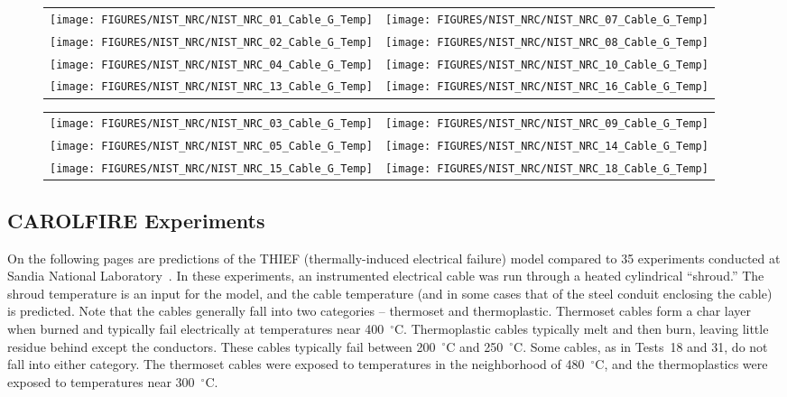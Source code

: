 \begin{figure}[p]
\begin{tabular*}{\textwidth}{l@{\extracolsep{\fill}}r}
\texttt{[image: FIGURES/NIST\_NRC/NIST\_NRC\_01\_Cable\_G\_Temp]} &
\texttt{[image: FIGURES/NIST\_NRC/NIST\_NRC\_07\_Cable\_G\_Temp]} \\
\texttt{[image: FIGURES/NIST\_NRC/NIST\_NRC\_02\_Cable\_G\_Temp]} &
\texttt{[image: FIGURES/NIST\_NRC/NIST\_NRC\_08\_Cable\_G\_Temp]} \\
\texttt{[image: FIGURES/NIST\_NRC/NIST\_NRC\_04\_Cable\_G\_Temp]} &
\texttt{[image: FIGURES/NIST\_NRC/NIST\_NRC\_10\_Cable\_G\_Temp]} \\
\texttt{[image: FIGURES/NIST\_NRC/NIST\_NRC\_13\_Cable\_G\_Temp]} &
\texttt{[image: FIGURES/NIST\_NRC/NIST\_NRC\_16\_Cable\_G\_Temp]}
\end{tabular*}
\label{NIST_NRC_Cable_G_Closed}
\end{figure}

\begin{figure}[p]
\begin{tabular*}{\textwidth}{l@{\extracolsep{\fill}}r}
\texttt{[image: FIGURES/NIST\_NRC/NIST\_NRC\_03\_Cable\_G\_Temp]} &
\texttt{[image: FIGURES/NIST\_NRC/NIST\_NRC\_09\_Cable\_G\_Temp]} \\
\texttt{[image: FIGURES/NIST\_NRC/NIST\_NRC\_05\_Cable\_G\_Temp]} &
\texttt{[image: FIGURES/NIST\_NRC/NIST\_NRC\_14\_Cable\_G\_Temp]} \\
\texttt{[image: FIGURES/NIST\_NRC/NIST\_NRC\_15\_Cable\_G\_Temp]} &
\texttt{[image: FIGURES/NIST\_NRC/NIST\_NRC\_18\_Cable\_G\_Temp]}
\end{tabular*}
\label{NIST_NRC_Cable_G_Open}
\end{figure}

\clearpage



\subsection{CAROLFIRE Experiments}

On the following pages are predictions of the THIEF (thermally-induced electrical failure) model compared to 35 experiments conducted at Sandia National Laboratory~\cite{CAROLFIRE}. In these experiments, an instrumented electrical cable was run through a heated cylindrical ``shroud.'' The shroud temperature is an input for the model, and the cable temperature (and in some cases that of the steel conduit enclosing the cable) is predicted. Note that the cables generally fall into two categories -- thermoset and thermoplastic. Thermoset cables form a char layer when burned and typically fail electrically at temperatures near 400~$^\circ$C. Thermoplastic cables typically melt and then burn, leaving little residue behind except the conductors. These cables typically fail between 200~$^\circ$C and 250~$^\circ$C. Some cables, as in Tests~18 and 31, do not fall into either category. The thermoset cables were exposed to temperatures in the neighborhood of 480~$^\circ$C, and the thermoplastics were exposed to temperatures near 300~$^\circ$C.

